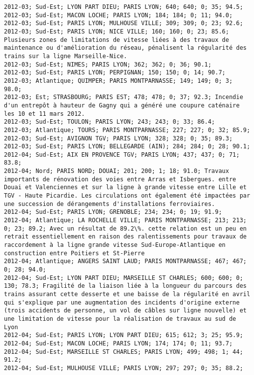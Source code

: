 \documentclass{article}
\begin{document}
\begin{Verbatim}[commandchars=\\\{\}]
2012-03; Sud-Est; LYON PART DIEU; PARIS LYON; 640; 640; 0; 35; 94.5; 
2012-03; Sud-Est; MACON LOCHE; PARIS LYON; 184; 184; 0; 11; 94.0; 
2012-03; Sud-Est; PARIS LYON; MULHOUSE VILLE; 309; 309; 0; 23; 92.6; 
2012-03; Sud-Est; PARIS LYON; NICE VILLE; 160; 160; 0; 23; 85.6; Plusieurs zones de limitations de vitesse liées à des travaux de maintenance ou d'amélioration du réseau, pénalisent la régularité des trains sur la ligne Marseille-Nice.
2012-03; Sud-Est; NIMES; PARIS LYON; 362; 362; 0; 36; 90.1; 
2012-03; Sud-Est; PARIS LYON; PERPIGNAN; 150; 150; 0; 14; 90.7; 
2012-03; Atlantique; QUIMPER; PARIS MONTPARNASSE; 149; 149; 0; 3; 98.0; 
2012-03; Est; STRASBOURG; PARIS EST; 478; 478; 0; 37; 92.3; Incendie d'un entrepôt à hauteur de Gagny qui a généré une coupure caténaire les 10 et 11 mars 2012.
2012-03; Sud-Est; TOULON; PARIS LYON; 243; 243; 0; 33; 86.4; 
2012-03; Atlantique; TOURS; PARIS MONTPARNASSE; 227; 227; 0; 32; 85.9; 
2012-03; Sud-Est; AVIGNON TGV; PARIS LYON; 328; 328; 0; 35; 89.3; 
2012-03; Sud-Est; PARIS LYON; BELLEGARDE (AIN); 284; 284; 0; 28; 90.1; 
2012-04; Sud-Est; AIX EN PROVENCE TGV; PARIS LYON; 437; 437; 0; 71; 83.8; 
2012-04; Nord; PARIS NORD; DOUAI; 201; 200; 1; 18; 91.0; Travaux importants de rénovation des voies entre Arras et Isbergues. entre Douai et Valenciennes et sur la ligne à grande vitesse entre Lille et TGV - Haute Picardie. Les circulations ont également été impactées par une succession de dérangements d'installations ferroviaires.
2012-04; Sud-Est; PARIS LYON; GRENOBLE; 234; 234; 0; 19; 91.9; 
2012-04; Atlantique; LA ROCHELLE VILLE; PARIS MONTPARNASSE; 213; 213; 0; 23; 89.2; Avec un résultat de 89.2\%. cette relation est un peu en retrait essentiellement en raison des ralentissements pour travaux de raccordement à la ligne grande vitesse Sud-Europe-Atlantique en construction entre Poitiers et St-Pierre
2012-04; Atlantique; ANGERS SAINT LAUD; PARIS MONTPARNASSE; 467; 467; 0; 28; 94.0; 
2012-04; Sud-Est; LYON PART DIEU; MARSEILLE ST CHARLES; 600; 600; 0; 130; 78.3; Fragilité de la liaison liée à la longueur du parcours des trains assurant cette desserte et une baisse de la régularité en avril qui s'explique par une augmentation des incidents d'origine externe (trois accidents de personne, un vol de câbles sur ligne nouvelle) et une limitation de vitesse pour la réalisation de travaux au sud de Lyon
2012-04; Sud-Est; PARIS LYON; LYON PART DIEU; 615; 612; 3; 25; 95.9; 
2012-04; Sud-Est; MACON LOCHE; PARIS LYON; 174; 174; 0; 11; 93.7; 
2012-04; Sud-Est; MARSEILLE ST CHARLES; PARIS LYON; 499; 498; 1; 44; 91.2; 
2012-04; Sud-Est; MULHOUSE VILLE; PARIS LYON; 297; 297; 0; 35; 88.2; 

\end{Verbatim}
\end{document}
